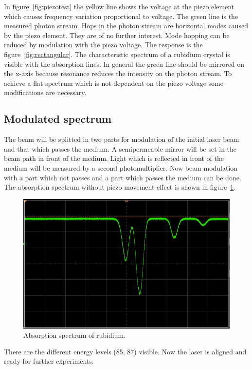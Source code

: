 In figure~\ref{fig:piezotest} the yellow line shows the voltage at the piezo
element which causes frequency variation proportional to voltage.
The green line is the measured photon stream. 
Hops in the photon stream are horizontal modes caused by the piezo element.
They are of no further interest.
Mode hopping can be reduced by modulation with the piezo voltage. 
The response is the figure~\ref{fig:rectangular}.
The characteristic spectrum of a rubidium crystal is visible with the
absorption lines. 
In general the green line should be mirrored on the x-axis because resonance
reduces the intensity on the photon stream. 
To achieve a flat spectrum which is not dependent on the piezo voltage some
modifications are necessary.

\subsection{Modulated spectrum}%
\label{sub:modulated_spectrum}

The beam will be splitted in two parts
for modulation of the initial laser beam and that which passes the medium.
A semipermeable mirror will be set in the beam path in front of the medium. 
Light which is reflected in front of the medium will be measured by a second photomultiplier.
Now beam modulation with a part which not passes and a part which passes the
medium can be done. 
The absorption spectrum without piezo movement effect is shown in figure~\ref{fig:modulation}.
\begin{figure}[h]
		\centering
		\includegraphics[width=0.8\linewidth]{./content/pictures/scope_140.png}
		\caption{Absorption spectrum of rubidium.}%
		\label{fig:modulation}
\end{figure}
There are the different energy levels (85, 87) visible.
Now the laser is aligned and ready for further experiments.
